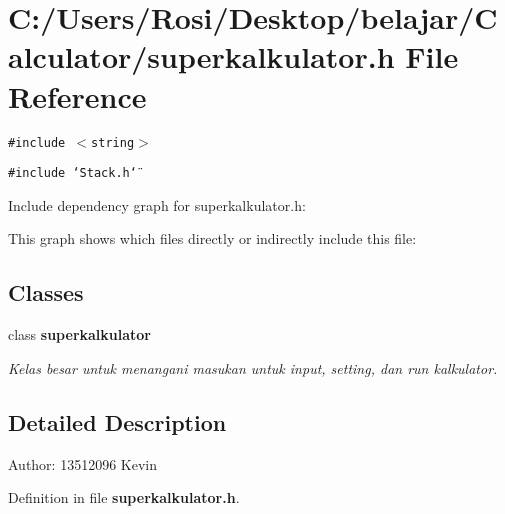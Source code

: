 \section{C:/Users/Rosi/Desktop/belajar/Calculator/superkalkulator.h File Reference}
\label{superkalkulator_8h}
{\tt \#include $<$string$>$}\par
{\tt \#include \char`\"{}Stack.h\char`\"{}}\par


Include dependency graph for superkalkulator.h:

This graph shows which files directly or indirectly include this file:\subsection*{Classes}
\begin{CompactItemize}
\item 
class {\bf superkalkulator}
\begin{CompactList}\small\item\em Kelas besar untuk menangani masukan untuk input, setting, dan run kalkulator. \item\end{CompactList}\end{CompactItemize}


\subsection{Detailed Description}
\begin{Desc}
\item[Author:]13512096 Kevin \end{Desc}


Definition in file {\bf superkalkulator.h}.